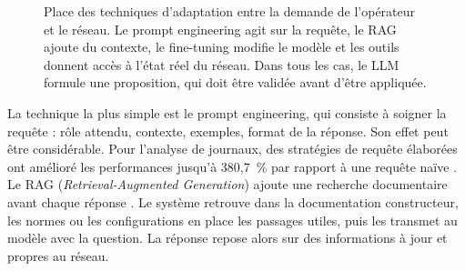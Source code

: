 \begin{figure}[htbp]
\centering
{}
\caption{Place des techniques d'adaptation entre la demande de l'opérateur et le réseau. Le prompt engineering agit sur la requête, le RAG ajoute du contexte, le fine-tuning modifie le modèle et les outils donnent accès à l'état réel du réseau. Dans tous les cas, le LLM formule une proposition, qui doit être validée avant d'être appliquée.}
\label{fig:adaptation}
\end{figure}

La technique la plus simple est le prompt engineering, qui consiste à soigner la requête : rôle attendu, contexte, exemples, format de la réponse. Son effet peut être considérable. Pour l'analyse de journaux, des stratégies de requête élaborées ont amélioré les performances jusqu'à 380,7~\% par rapport à une requête naïve \cite{liu2024}. Le RAG (\emph{Retrieval-Augmented Generation}) ajoute une recherche documentaire avant chaque réponse \cite{lewis2020}. Le système retrouve dans la documentation constructeur, les normes ou les configurations en place les passages utiles, puis les transmet au modèle avec la question. La réponse repose alors sur des informations à jour et propres au réseau.

